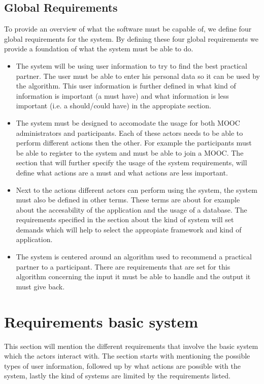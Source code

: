 \documentclass[]{article}
\begin{document}
\subsection{Global Requirements}
To provide an overview of what the software must be capable of, we define four global requirements for the system.
By defining these four global requirements we provide a foundation of what the system must be able to do.
\begin{itemize}
\item The system will be using user information to try to find the best practical partner.
The user must be able to enter his personal data so it can be used by the algorithm.
This user information is further defined in what kind of information is important (a must have) and what information is less important (i.e. a should/could have) in the appropiate section.
\item The system must be designed to accomodate the usage for both MOOC administrators and participants.
Each of these actors needs to be able to perform different actions then the other.
For example the participants must be able to register to the system and must be able to join a MOOC.
The section that will further specify the usage of the system requirements, will define what actions are a must and what actions are less important.
\item Next to the actions different actors can perform using the system, the system must also be defined in other terms.
These terms are about for example about the accesability of the application and the usage of a database.
The requirements specified in the section about the kind of system will set demands which will help to select the appropiate framework and kind of application.
\item The system is centered around an algorithm used to recommend a practical partner to a participant.
There are requirements that are set for this algorithm concerning the input it must be able to handle and the output it must give back.
\end{itemize}

\section{Requirements basic system}
This section will mention the different requirements that involve the basic system which the actors interact with.
The section starts with mentioning the possible types of user information, followed up by what actions are possible with the system, lastly the kind of systems are limited by the requirements listed.
\end{document}

